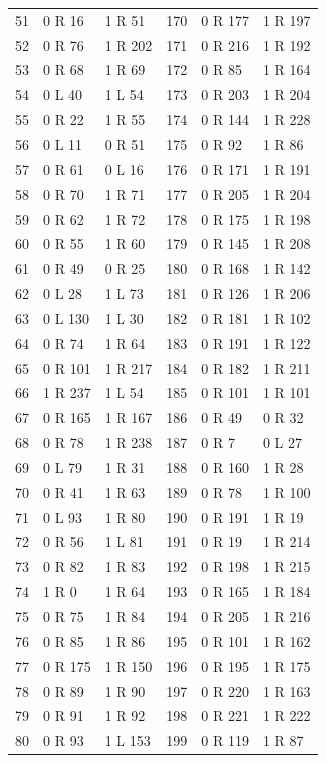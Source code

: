 \begin{center}
\begin{longtable}{rll@{\qquad}rll}
51 & 0 R 16 & 1 R 51 & 170 & 0 R 177 & 1 R 197\\
52 & 0 R 76 & 1 R 202 & 171 & 0 R 216 & 1 R 192\\
53 & 0 R 68 & 1 R 69 & 172 & 0 R 85 & 1 R 164\\
54 & 0 L 40 & 1 L 54 & 173 & 0 R 203 & 1 R 204\\
55 & 0 R 22 & 1 R 55 & 174 & 0 R 144 & 1 R 228\\
56 & 0 L 11 & 0 R 51 & 175 & 0 R 92 & 1 R 86\\
57 & 0 R 61 & 0 L 16 & 176 & 0 R 171 & 1 R 191\\
58 & 0 R 70 & 1 R 71 & 177 & 0 R 205 & 1 R 204\\
59 & 0 R 62 & 1 R 72 & 178 & 0 R 175 & 1 R 198\\
60 & 0 R 55 & 1 R 60 & 179 & 0 R 145 & 1 R 208\\
61 & 0 R 49 & 0 R 25 & 180 & 0 R 168 & 1 R 142\\
62 & 0 L 28 & 1 L 73 & 181 & 0 R 126 & 1 R 206\\
63 & 0 L 130 & 1 L 30 & 182 & 0 R 181 & 1 R 102\\
64 & 0 R 74 & 1 R 64 & 183 & 0 R 191 & 1 R 122\\
65 & 0 R 101 & 1 R 217 & 184 & 0 R 182 & 1 R 211\\
66 & 1 R 237 & 1 L 54 & 185 & 0 R 101 & 1 R 101\\
67 & 0 R 165 & 1 R 167 & 186 & 0 R 49 & 0 R 32\\
68 & 0 R 78 & 1 R 238 & 187 & 0 R 7 & 0 L 27\\
69 & 0 L 79 & 1 R 31 & 188 & 0 R 160 & 1 R 28\\
70 & 0 R 41 & 1 R 63 & 189 & 0 R 78 & 1 R 100\\
71 & 0 L 93 & 1 R 80 & 190 & 0 R 191 & 1 R 19\\
72 & 0 R 56 & 1 L 81 & 191 & 0 R 19 & 1 R 214\\
73 & 0 R 82 & 1 R 83 & 192 & 0 R 198 & 1 R 215\\
74 & 1 R 0 & 1 R 64 & 193 & 0 R 165 & 1 R 184\\
75 & 0 R 75 & 1 R 84 & 194 & 0 R 205 & 1 R 216\\
76 & 0 R 85 & 1 R 86 & 195 & 0 R 101 & 1 R 162\\
77 & 0 R 175 & 1 R 150 & 196 & 0 R 195 & 1 R 175\\
78 & 0 R 89 & 1 R 90 & 197 & 0 R 220 & 1 R 163\\
79 & 0 R 91 & 1 R 92 & 198 & 0 R 221 & 1 R 222\\
80 & 0 R 93 & 1 L 153 & 199 & 0 R 119 & 1 R 87\\

\end{longtable}
\end{center}
